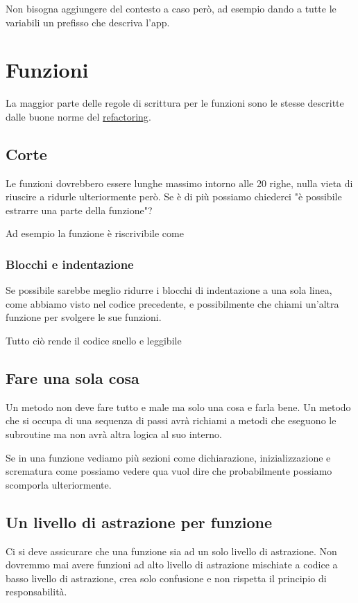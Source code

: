 \documentclass[11pt,a4paper]{book}
\begin{document}
Non bisogna aggiungere del contesto a caso però, ad esempio dando a tutte le variabili un prefisso che descriva l'app.

\chapter{Funzioni}
La maggior parte delle regole di scrittura per le funzioni sono le stesse descritte dalle buone norme del \href{https://refactoring.guru/refactoring/techniques}{refactoring}.

\section{Corte}
Le funzioni dovrebbero essere lunghe massimo intorno alle 20 righe, nulla vieta di riuscire a ridurle ulteriormente però. Se è di più possiamo chiederci "è possibile estrarre una parte della funzione"?

Ad esempio la funzione
\label{code: 012}
è riscrivibile come
\label{code: 013}

\subsection{Blocchi e indentazione}
Se possibile sarebbe meglio ridurre i blocchi di indentazione a una sola linea, come abbiamo visto nel codice precedente, e possibilmente che chiami un'altra funzione per svolgere le sue funzioni.

Tutto ciò rende il codice snello e leggibile

\section{Fare una sola cosa}
Un metodo non deve fare tutto e male ma solo una cosa e farla bene. Un metodo che si occupa di una sequenza di passi avrà richiami a metodi che eseguono le subroutine ma non avrà altra logica al suo interno.

Se in una funzione vediamo più sezioni come dichiarazione, inizializzazione e scrematura come possiamo vedere qua
\label{code: 014}
vuol dire che probabilmente possiamo scomporla ulteriormente.

\section{Un livello di astrazione per funzione}
Ci si deve assicurare che una funzione sia ad un solo livello di astrazione. Non dovremmo mai avere funzioni ad alto livello di astrazione mischiate a codice a basso livello di astrazione, crea solo confusione e non rispetta il principio di responsabilità.
\end{document}
